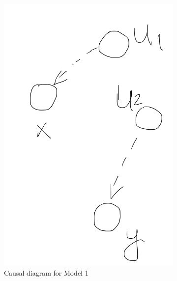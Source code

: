\documentclass[fleqn]{article}
\numberwithin{equation}{section}
\numberwithin{theorem}{section}
\numberwithin{figure}{section}
\numberwithin{lemma}{section}
\numberwithin{corollary}{section}
\begin{document}
\begin{figure}[!tbph]
\begin{subfigure}[t]{0.25\textwidth}
		\includegraphics[width=\textwidth]{imgs/img13.png}
		\caption{Causal diagram for Model 1}
		\label{fig:treatment_sample_cm1}
	\end{subfigure}
	\begin{subfigure}[t]{0.25\textwidth}

\end{subfigure}
\end{figure}
\end{document}
